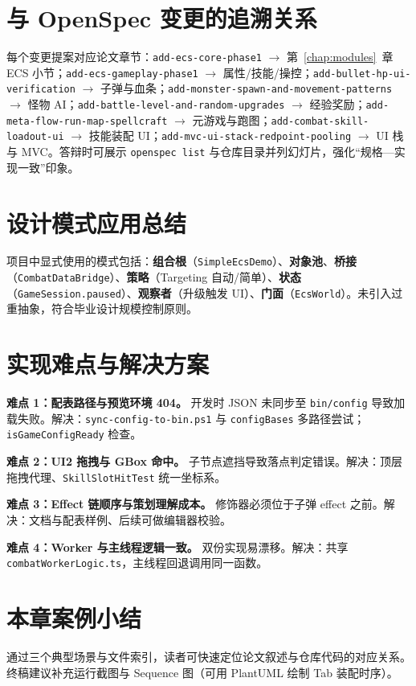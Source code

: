 \section{与 OpenSpec 变更的追溯关系}

每个变更提案对应论文章节：\texttt{add-ecs-core-phase1} $\rightarrow$ 第~\ref{chap:modules}~章 ECS 小节；\texttt{add-ecs-gameplay-phase1} $\rightarrow$ 属性/技能/操控；\texttt{add-bullet-hp-ui-verification} $\rightarrow$ 子弹与血条；\texttt{add-monster-spawn-and-movement-patterns} $\rightarrow$ 怪物 AI；\texttt{add-battle-level-and-random-upgrades} $\rightarrow$ 经验奖励；\texttt{add-meta-flow-run-map-spellcraft} $\rightarrow$ 元游戏与跑图；\texttt{add-combat-skill-loadout-ui} $\rightarrow$ 技能装配 UI；\texttt{add-mvc-ui-stack-redpoint-pooling} $\rightarrow$ UI 栈与 MVC。答辩时可展示 \texttt{openspec list} 与仓库目录并列幻灯片，强化“规格—实现一致”印象\cite{kw_spec_driven_dev}。

\section{设计模式应用总结}

项目中显式使用的模式包括：\textbf{组合根}（\texttt{SimpleEcsDemo}）、\textbf{对象池}、\textbf{桥接}（\texttt{CombatDataBridge}）、\textbf{策略}（Targeting 自动/简单）、\textbf{状态}（\texttt{GameSession.paused}）、\textbf{观察者}（升级触发 UI）、\textbf{门面}（\texttt{EcsWorld}）。未引入过重抽象，符合毕业设计规模控制原则。

\section{实现难点与解决方案}

\textbf{难点 1：配表路径与预览环境 404。} 开发时 JSON 未同步至 \texttt{bin/config} 导致加载失败。解决：\texttt{sync-config-to-bin.ps1} 与 \texttt{configBases} 多路径尝试；\texttt{isGameConfigReady} 检查。

\textbf{难点 2：UI2 拖拽与 GBox 命中。} 子节点遮挡导致落点判定错误。解决：顶层拖拽代理、\texttt{SkillSlotHitTest} 统一坐标系。

\textbf{难点 3：Effect 链顺序与策划理解成本。} 修饰器必须位于子弹 effect 之前。解决：文档与配表样例、后续可做编辑器校验。

\textbf{难点 4：Worker 与主线程逻辑一致。} 双份实现易漂移。解决：共享 \texttt{combatWorkerLogic.ts}，主线程回退调用同一函数。

\section{本章案例小结}

通过三个典型场景与文件索引，读者可快速定位论文叙述与仓库代码的对应关系。终稿建议补充运行截图与 Sequence 图（可用 PlantUML 绘制 Tab 装配时序）。

